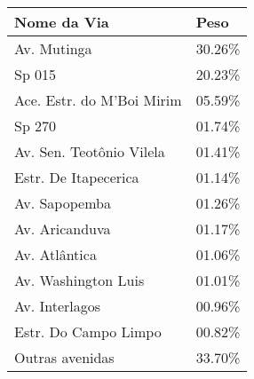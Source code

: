\begin{tiny}
    \centering
\begin{tabular}{p{}p{}}
\hline
Nome da Via & Peso \\ 
  \hline
Av. Mutinga & 30.26\% \\ 
Sp 015 & 20.23\% \\ 
Ace. Estr. do M'Boi Mirim & 05.59\% \\ 
Sp 270 & 01.74\% \\ 
Av. Sen. Teotônio Vilela & 01.41\% \\
Estr. De Itapecerica & 01.14\% \\
Av. Sapopemba & 01.26\% \\ 
Av. Aricanduva & 01.17\% \\ 
Av. Atlântica & 01.06\% \\
Av. Washington Luis & 01.01\% \\
Av. Interlagos & 00.96\% \\ 
Estr. Do Campo Limpo & 00.82\% \\ 
Outras avenidas & 33.70\%
 
\end{tabular}
\end{tiny}